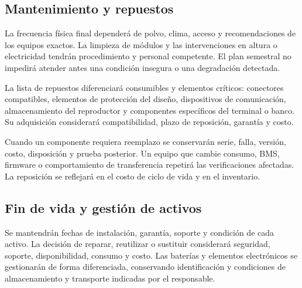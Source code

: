 \subsection{Mantenimiento y repuestos}

La frecuencia física final dependerá de polvo, clima, acceso y recomendaciones de los equipos exactos. La limpieza de módulos y las intervenciones en altura o electricidad tendrán procedimiento y personal competente. El plan semestral no impedirá atender antes una condición insegura o una degradación detectada.

La lista de repuestos diferenciará consumibles y elementos críticos: conectores compatibles, elementos de protección del diseño, dispositivos de comunicación, almacenamiento del reproductor y componentes específicos del terminal o banco. Su adquisición considerará compatibilidad, plazo de reposición, garantía y costo.

Cuando un componente requiera reemplazo se conservarán serie, falla, versión, costo, disposición y prueba posterior. Un equipo que cambie consumo, BMS, firmware o comportamiento de transferencia repetirá las verificaciones afectadas. La reposición se reflejará en el costo de ciclo de vida y en el inventario.

\subsection{Fin de vida y gestión de activos}
Se mantendrán fechas de instalación, garantía, soporte y condición de cada activo. La decisión de reparar, reutilizar o sustituir considerará seguridad, soporte, disponibilidad, consumo y costo. Las baterías y elementos electrónicos se gestionarán de forma diferenciada, conservando identificación y condiciones de almacenamiento y transporte indicadas por el responsable.

